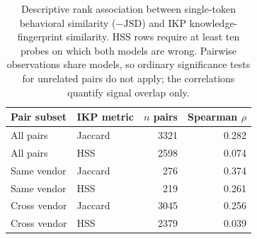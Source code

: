\begin{table}[H]
    \centering
    \small
    \begin{tabular}{llrr}
        \toprule
        Pair subset & IKP metric & $n$ pairs & Spearman $\rho$ \\
        \midrule
All pairs & Jaccard & 3321 & 0.282 \\
All pairs & HSS & 2598 & 0.074 \\
Same vendor & Jaccard & 276 & 0.374 \\
Same vendor & HSS & 219 & 0.261 \\
Cross vendor & Jaccard & 3045 & 0.256 \\
Cross vendor & HSS & 2379 & 0.039 \\
        \bottomrule
    \end{tabular}
    \caption{Descriptive rank association between single-token behavioral similarity ($-\mathrm{JSD}$) and IKP knowledge-fingerprint similarity. HSS rows require at least ten probes on which both models are wrong. Pairwise observations share models, so ordinary significance tests for unrelated pairs do not apply; the correlations quantify signal overlap only.}
    \label{tab:single-token-complementarity}
\end{table}
